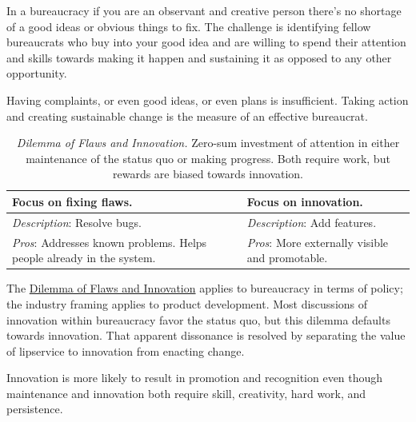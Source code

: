 In a bureaucracy if you are an observant and creative person there's no shortage of a good ideas or obvious things to fix.
The challenge is identifying fellow bureaucrats who buy into your good idea and are willing to spend their attention and skills towards making it happen and sustaining it as opposed to any other opportunity.

Having complaints, or even good ideas, or even plans is insufficient. Taking action and creating sustainable change is the measure of an effective bureaucrat.



\begin{center}
\begin{table}[H] %
\begin{tabular}{ | m{\dilemmatablewidth}| m{\dilemmatablewidth} | } 
  \hline
  \textbf{Focus on fixing flaws.} &
  \textbf{Focus on innovation.} \\
  \hline
  \textit{Description}: Resolve bugs. &
  \textit{Description}: Add features. \\
  \hline
  \textit{Pros}: Addresses known problems. Helps people already in the system.  & 
  \textit{Pros}: More externally visible and promotable. \\
  \hline
\end{tabular}
\caption{
\textit{Dilemma of Flaws and Innovation.}
Zero-sum investment of attention in either maintenance of the status quo or making progress. Both require work, but rewards are biased towards innovation. 
}
\label{table:flaws-and-innovation}
\end{table}
\end{center}

The \href{table:flaws-and-innovation}{Dilemma of Flaws and Innovation} applies to bureaucracy in terms of policy; the industry framing applies to product development. Most discussions of innovation within bureaucracy favor the status quo, but this dilemma defaults towards innovation. That apparent dissonance is resolved by separating the value of lipservice to innovation from enacting change.

Innovation is more likely to result in promotion and recognition even though maintenance and innovation both require skill, creativity, hard work, and persistence. 

